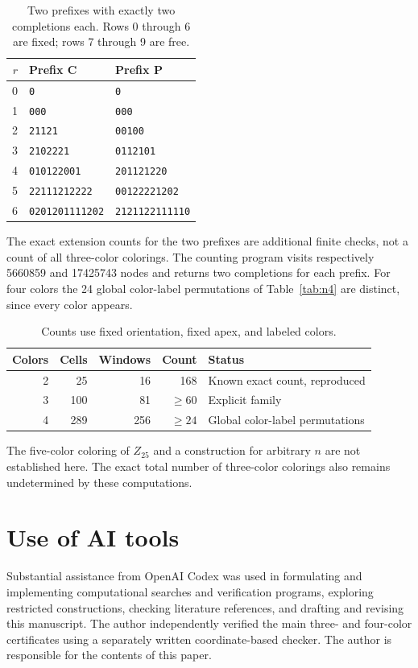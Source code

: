\documentclass[11pt]{article}
\begin{document}
\begin{table}[ht]\centering\small
\begin{tabular}{rll}\toprule
$r$ & Prefix C & Prefix P \\\midrule
0 & \texttt{0} & \texttt{0} \\
1 & \texttt{000} & \texttt{000} \\
2 & \texttt{21121} & \texttt{00100} \\
3 & \texttt{2102221} & \texttt{0112101} \\
4 & \texttt{010122001} & \texttt{201121220} \\
5 & \texttt{22111212222} & \texttt{00122221202} \\
6 & \texttt{0201201111202} & \texttt{2121122111110} \\
\bottomrule\end{tabular}
\caption{Two prefixes with exactly two completions each. Rows 0 through 6
are fixed; rows 7 through 9 are free.}\label{tab:prefixes}
\end{table}

The exact extension counts for the two prefixes are additional finite
checks, not a count of all three-color colorings. The counting program
visits respectively 5660859 and 17425743 nodes and returns two
completions for each prefix. For four colors the 24 global color-label
permutations of Table~\ref{tab:n4} are distinct, since every color appears.

\begin{table}[ht]\centering\small
\begin{tabular}{rrrrl}\toprule
Colors & Cells & Windows & Count & Status \\\midrule
2 & 25 & 16 & 168 & Known exact count, reproduced \\
3 & 100 & 81 & $\ge60$ & Explicit family \\
4 & 289 & 256 & $\ge24$ & Global color-label permutations \\
\bottomrule\end{tabular}
\caption{Counts use fixed orientation, fixed apex, and labeled colors.}
\label{tab:counts}
\end{table}

The five-color coloring of $Z_{25}$ and a construction for arbitrary
$n$ are not established here. The exact total number of three-color
colorings also remains undetermined by these computations.

\section*{Use of AI tools}
Substantial assistance from OpenAI Codex was used in formulating and
implementing computational searches and verification programs, exploring
restricted constructions, checking literature references, and drafting
and revising this manuscript. The author independently verified the main
three- and four-color certificates using a separately written
coordinate-based checker. The author is responsible for the contents
of this paper.
\end{document}
